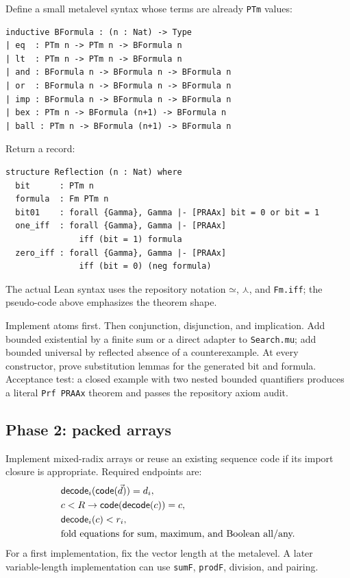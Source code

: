 Define a small metalevel syntax whose terms are already \texttt{PTm} values:
\begin{lstlisting}[language={}]
inductive BFormula : (n : Nat) -> Type
| eq  : PTm n -> PTm n -> BFormula n
| lt  : PTm n -> PTm n -> BFormula n
| and : BFormula n -> BFormula n -> BFormula n
| or  : BFormula n -> BFormula n -> BFormula n
| imp : BFormula n -> BFormula n -> BFormula n
| bex : PTm n -> BFormula (n+1) -> BFormula n
| ball : PTm n -> BFormula (n+1) -> BFormula n
\end{lstlisting}
Return a record:
\begin{lstlisting}[language={}]
structure Reflection (n : Nat) where
  bit      : PTm n
  formula  : Fm PTm n
  bit01    : forall {Gamma}, Gamma |- [PRAAx] bit = 0 or bit = 1
  one_iff  : forall {Gamma}, Gamma |- [PRAAx]
               iff (bit = 1) formula
  zero_iff : forall {Gamma}, Gamma |- [PRAAx]
               iff (bit = 0) (neg formula)
\end{lstlisting}
The actual Lean syntax uses the repository notation \(\mathord{\simeq}\), \(\mathbin{\curlywedge}\), and \texttt{Fm.iff}; the pseudo-code above emphasizes the theorem shape.

Implement atoms first.  Then conjunction, disjunction, and implication.  Add bounded existential by a finite sum or a direct adapter to \texttt{Search.mu}; add bounded universal by reflected absence of a counterexample.  At every constructor, prove substitution lemmas for the generated bit and formula.  Acceptance test: a closed example with two nested bounded quantifiers produces a literal \texttt{Prf PRAAx} theorem and passes the repository axiom audit.

\subsection{Phase 2: packed arrays}

Implement mixed-radix arrays or reuse an existing sequence code if its import closure is appropriate.  Required endpoints are:
\begin{align*}
 &\mathsf{decode}_i(\mathsf{code}(\vec d))=d_i,\\
 &c<R\to\mathsf{code}(\mathsf{decode}(c))=c,\\
 &\mathsf{decode}_i(c)<r_i,\\
 &\text{fold equations for sum, maximum, and Boolean all/any.}
\end{align*}
For a first implementation, fix the vector length at the metalevel.  A later variable-length implementation can use \texttt{sumF}, \texttt{prodF}, division, and pairing.

